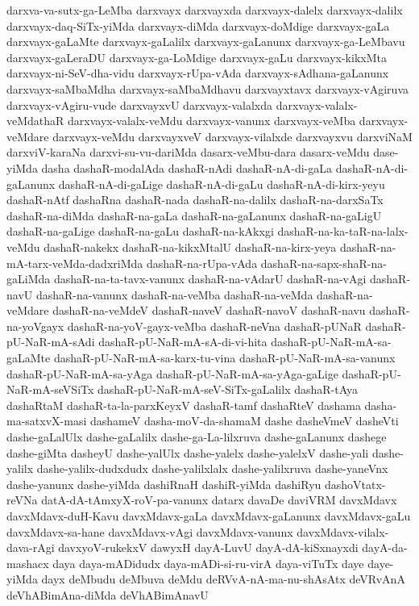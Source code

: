 {darxva-va-sutx-ga-LeMba
darxvayx
darxvayxda
darxvayx-dalelx
darxvayx-dalilx
darxvayx-daq-SiTx-yiMda
darxvayx-diMda
darxvayx-doMdige
darxvayx-gaLa
darxvayx-gaLaMte
darxvayx-gaLalilx
darxvayx-gaLanunx
darxvayx-ga-LeMbavu
darxvayx-gaLeraDU
darxvayx-ga-LoMdige
darxvayx-gaLu
darxvayx-kikxMta
darxvayx-ni-SeV-dha-vidu
darxvayx-rUpa-vAda
darxvayx-sAdhana-gaLanunx
darxvayx-saMbaMdha
darxvayx-saMbaMdhavu
darxvayxtavx
darxvayx-vAgiruva
darxvayx-vAgiru-vude
darxvayxvU
darxvayx-valalxda
darxvayx-valalx-veMdathaR
darxvayx-valalx-veMdu
darxvayx-vanunx
darxvayx-veMba
darxvayx-veMdare
darxvayx-veMdu
darxvayxveV
darxvayx-vilalxde
darxvayxvu
darxviNaM
darxviV-karaNa
darxvi-su-vu-dariMda
dasarx-veMbu-dara
dasarx-veMdu
dase-yiMda
dasha
dashaR-modalAda
dashaR-nAdi
dashaR-nA-di-gaLa
dashaR-nA-di-gaLanunx
dashaR-nA-di-gaLige
dashaR-nA-di-gaLu
dashaR-nA-di-kirx-yeyu
dashaR-nAtf
dashaRna
dashaR-nada
dashaR-na-dalilx
dashaR-na-darxSaTx
dashaR-na-diMda
dashaR-na-gaLa
dashaR-na-gaLanunx
dashaR-na-gaLigU
dashaR-na-gaLige
dashaR-na-gaLu
dashaR-na-kAkxgi
dashaR-na-ka-taR-na-lalx-veMdu
dashaR-nakekx
dashaR-na-kikxMtalU
dashaR-na-kirx-yeya
dashaR-na-mA-tarx-veMda-dadxriMda
dashaR-na-rUpa-vAda
dashaR-na-sapx-shaR-na-gaLiMda
dashaR-na-ta-tavx-vanunx
dashaR-na-vAdarU
dashaR-na-vAgi
dashaR-navU
dashaR-na-vanunx
dashaR-na-veMba
dashaR-na-veMda
dashaR-na-veMdare
dashaR-na-veMdeV
dashaR-naveV
dashaR-navoV
dashaR-navu
dashaR-na-yoVgayx
dashaR-na-yoV-gayx-veMba
dashaR-neVna
dashaR-pUNaR
dashaR-pU-NaR-mA-sAdi
dashaR-pU-NaR-mA-sA-di-vi-hita
dashaR-pU-NaR-mA-sa-gaLaMte
dashaR-pU-NaR-mA-sa-karx-tu-vina
dashaR-pU-NaR-mA-sa-vanunx
dashaR-pU-NaR-mA-sa-yAga
dashaR-pU-NaR-mA-sa-yAga-gaLige
dashaR-pU-NaR-mA-seVSiTx
dashaR-pU-NaR-mA-seV-SiTx-gaLalilx
dashaR-tAya
dashaRtaM
dashaR-ta-la-parxKeyxV
dashaR-tamf
dashaRteV
dashama
dasha-ma-satxvX-masi
dashameV
dasha-moV-da-shamaM
dashe
dasheVmeV
dasheVti
dashe-gaLalUlx
dashe-gaLalilx
dashe-ga-La-lilxruva
dashe-gaLanunx
dashege
dashe-giMta
dasheyU
dashe-yalUlx
dashe-yalelx
dashe-yalelxV
dashe-yali
dashe-yalilx
dashe-yalilx-dudxdudx
dashe-yalilxlalx
dashe-yalilxruva
dashe-yaneVnx
dashe-yanunx
dashe-yiMda
dashiRnaH
dashiR-yiMda
dashiRyu
dashoVtatx-reVNa
datA-dA-tAmxyX-roV-pa-vanunx
datarx
davaDe
daviVRM
davxMdavx
davxMdavx-duH-Kavu
davxMdavx-gaLa
davxMdavx-gaLanunx
davxMdavx-gaLu
davxMdavx-sa-hane
davxMdavx-vAgi
davxMdavx-vanunx
davxMdavx-vilalx-dava-rAgi
davxyoV-rukekxV
dawyxH
dayA-LuvU
dayA-dA-kiSxnayxdi
dayA-da-mashacx
daya
daya-mADidudx
daya-mADi-si-ru-virA
daya-viTuTx
daye
daye-yiMda
dayx
deMbudu
deMbuva
deMdu
deRVvA-nA-ma-nu-shAsAtx
deVRvAnA
deVhABimAna-diMda
deVhABimAnavU
}
